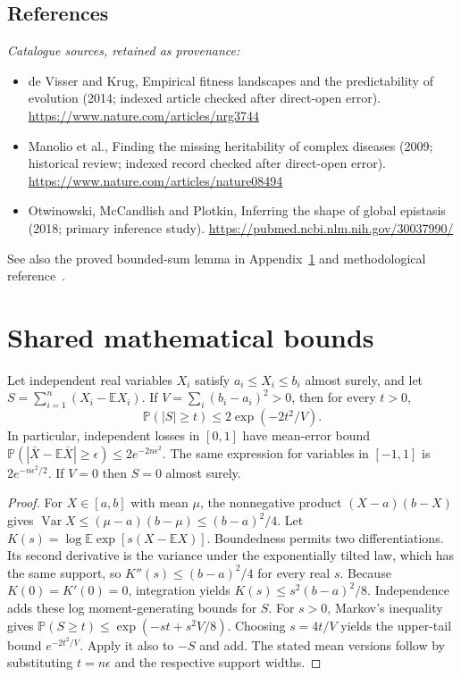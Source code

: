 \documentclass[11pt]{article}
\begin{document}
\subsection{References}
\noindent\emph{Catalogue sources, retained as provenance:}
\begin{itemize}
\item de Visser and Krug, Empirical fitness landscapes and the predictability of evolution (2014; indexed article checked after direct-open error). \url{https://www.nature.com/articles/nrg3744}
\item Manolio et al., Finding the missing heritability of complex diseases (2009; historical review; indexed record checked after direct-open error). \url{https://www.nature.com/articles/nature08494}
\item Otwinowski, McCandlish and Plotkin, Inferring the shape of global epistasis (2018; primary inference study). \url{https://pubmed.ncbi.nlm.nih.gov/30037990/}
\end{itemize}
\noindent See also the proved bounded-sum lemma in Appendix~\ref{app:bounds} and methodological reference~\cite{hoeffding}.




\section{Shared mathematical bounds}\label{app:bounds}
\begin{lemma}\label{lem:bounded}
Let independent real variables $X_i$ satisfy $a_i\leq X_i\leq b_i$ almost surely,
and let $S=\sum_{i=1}^n(X_i-\mathbb{E} X_i)$. If
$V=\sum_i(b_i-a_i)^2>0$, then for every $t>0$,
\[
 \mathbb{P}(|S|\geq t)\leq 2\exp(-2t^2/V).
\]
In particular, independent losses in $[0,1]$ have mean-error bound
$\mathbb{P}(|\overline X-\mathbb{E}\overline X|\geq\epsilon)
\leq2e^{-2n\epsilon^2}$. The same expression for variables in $[-1,1]$
is $2e^{-n\epsilon^2/2}$. If $V=0$ then $S=0$ almost surely.
\end{lemma}
\begin{proof}
For $X\in[a,b]$ with mean $\mu$, the nonnegative product
$(X-a)(b-X)$ gives
$\operatorname{Var} X\leq(\mu-a)(b-\mu)\leq(b-a)^2/4$.
Let $K(s)=\log\mathbb{E}\exp[s(X-\mathbb{E} X)]$.
Boundedness permits two differentiations. Its second derivative is the variance
under the exponentially tilted law, which has the same support, so
$K''(s)\leq(b-a)^2/4$ for every real $s$.
Because $K(0)=K'(0)=0$, integration yields
$K(s)\leq s^2(b-a)^2/8$.
Independence adds these log moment-generating bounds for $S$.
For $s>0$, Markov's inequality gives
$\mathbb{P}(S\geq t)\leq\exp(-st+s^2V/8)$.
Choosing $s=4t/V$ yields the upper-tail bound $e^{-2t^2/V}$.
Apply it also to $-S$ and add. The stated mean versions follow by substituting
$t=n\epsilon$ and the respective support widths.
\end{proof}
\end{document}
